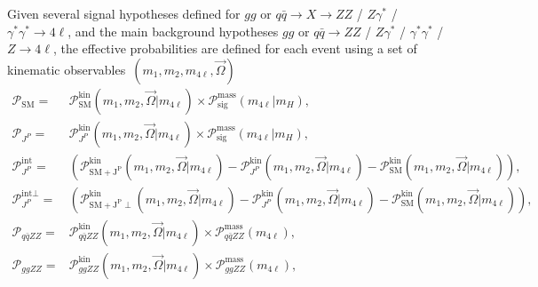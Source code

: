 Given several signal hypotheses defined for $gg$ or $q\bar{q}\to X\to ZZ$ / $Z\gamma^*$ / $\gamma^*\gamma^*\to4\ell$,
and the main background hypotheses $gg$ or $q\bar{q}\to ZZ$ / $Z\gamma^*$ / $\gamma^*\gamma^*$ / $Z\to 4\ell$,
the effective probabilities are defined for each event using a set of kinematic observables~$(m_1, m_2, m_{4\ell}, \vec\Omega)$
\begin{equation}\begin{aligned}
 \mathcal{P}_\mathrm{SM} =& \mathcal{P}^\text{kin}_\mathrm{SM} (m_1, m_2, \vec\Omega|m_{4\ell}) \times \mathcal{P}^\text{mass}_\text{sig} (m_{4\ell}|m_{H}), \\
 \mathcal{P}_{J^P} =& \mathcal{P}^\text{kin}_{J^P} (m_1, m_2, \vec\Omega|m_{4\ell}) \times \mathcal{P}^\text{mass}_\text{sig} (m_{4\ell}|m_{H}) ,\\
 \mathcal{P}_{J^P} ^\text{int} =& \left(\mathcal{P}^\text{kin}_\mathrm{SM + J^P}(m_1, m_2, \vec\Omega|m_{4\ell}) - \mathcal{P}^\text{kin}_{J^P} (m_1, m_2, \vec\Omega|m_{4\ell}) - \mathcal{P}^\text{kin}_\mathrm{SM}(m_1, m_2, \vec\Omega|m_{4\ell}) \right) , \\
 \mathcal{P}_{J^P} ^{\text{int} \perp} =& \left(\mathcal{P}^\text{kin}_{\mathrm{SM + J^P}\perp}(m_1, m_2, \vec\Omega|m_{4\ell}) - \mathcal{P}^\text{kin}_{J^P} (m_1, m_2, \vec\Omega|m_{4\ell}) - \mathcal{P}^\text{kin}_\mathrm{SM}(m_1, m_2, \vec\Omega|m_{4\ell}) \right) , \\
 \mathcal{P}_{q\bar{q}ZZ} =& \mathcal{P}^\text{kin}_{q\bar{q}ZZ} (m_1, m_2, \vec\Omega|m_{4\ell}) \times \mathcal{P}^\text{mass}_{q\bar{q}ZZ} (m_{4\ell}) , \\
 \mathcal{P}_{ggZZ} =& \mathcal{P}^\text{kin}_{ggZZ} (m_1, m_2, \vec\Omega|m_{4\ell}) \times \mathcal{P}^\text{mass}_{ggZZ} (m_{4\ell}) ,
\label{eq:kd-prob-gg}
\end{aligned}\end{equation}

